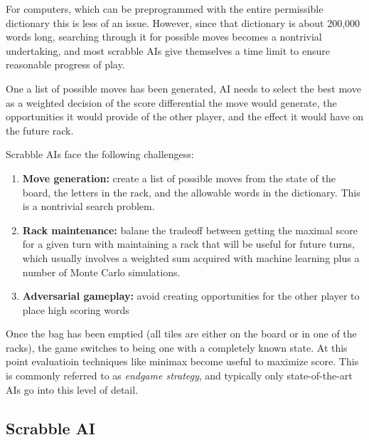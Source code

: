 \documentclass[12pt]{article}
\begin{document}
For computers, which can be preprogrammed with the entire permissible
dictionary this is less of an issue. However, since that dictionary is
about 200,000 words long, searching through it for possible moves
becomes a nontrivial undertaking, and most scrabble AIs give
themselves a time limit to ensure reasonable progress of play.

One a list of possible moves has been generated, AI needs to select
the best move as a weighted decision of the score differential the
move would generate, the opportunities it would provide of the other
player, and the effect it would have on the future rack.

Scrabble AIs face the following challengess:

\begin{enumerate}
  \item \textbf{Move generation:} create a list of possible moves from
    the state of the board, the letters in the rack, and the allowable
    words in the dictionary. This is a nontrivial search problem.
    
  \item \textbf{Rack maintenance:} balane the tradeoff between getting
    the maximal score for a given turn with maintaining a rack that
    will be useful for future turns, which usually involves a weighted
    sum acquired with machine learning plus a number of Monte Carlo
    simulations.
    
  \item \textbf{Adversarial gameplay:} avoid creating opportunities
    for the other player to place high scoring words 
\end{enumerate}

Once the bag has been emptied (all tiles are either on the board or in
one of the racks), the game switches to being one with a completely
known state. At this point evaluatioin techniques like minimax become
useful to maximize score. This is commonly referred to as
\emph{endgame strategy}, and typically only state-of-the-art AIs go
into this level of detail.

\subsection{Scrabble AI}
\end{document}
